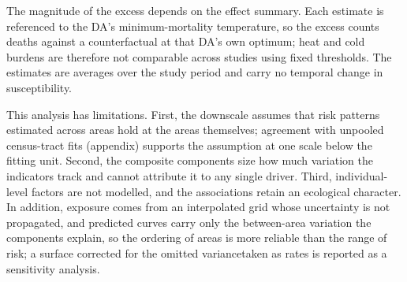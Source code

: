 \documentclass[12pt]{article}
\begin{document}
The magnitude of the excess depends on the effect summary. Each
estimate is referenced to the DA's minimum-mortality
temperature, so the excess counts deaths against a counterfactual
at that DA's own optimum; heat and cold burdens are therefore
not comparable across studies using fixed thresholds. The
estimates are averages over the study period and carry no
temporal change in susceptibility.

This analysis has limitations. First, the downscale assumes that
risk patterns estimated across areas hold at the areas
themselves; agreement with unpooled census-tract fits (appendix)
supports the assumption at one scale below the fitting unit.
Second, the composite components size how much variation the
indicators track and cannot attribute it to any single driver.
Third, individual-level factors are not modelled, and the
associations retain an ecological character. In addition,
exposure comes from an interpolated grid whose uncertainty is
not propagated, and predicted curves carry only the between-area
variation the components explain, so the ordering of areas is
more reliable than the range of risk; a surface corrected for
the omitted variancetaken as rates is reported as a sensitivity analysis.






\end{document}
